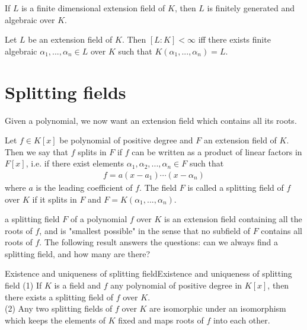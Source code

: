 \begin{theorem}{}{}
    If $L$ is a finite dimensional extension field of $K$, then $L$ is 
    finitely generated and algebraic over $K$.
\end{theorem}


\begin{theorem}{}{}
    Let $L$ be an extension field of $K$. Then 
    $[L:K]<\infty$ iff there exists finite algebraic $\alpha_1,...,\alpha_n\in L$ over $K$
    such that $K(\alpha_1,...,\alpha_n)=L$.
\end{theorem}

\section{Splitting fields}

Given a polynomial, we now want an extension field which contains all its roots.

\begin{definition}{}{}
    Let $f\in K[x]$ be polynomial of positive degree and $F$ an extension field of $K$.
    Then we say that $f$ splits in $F$ if $f$ can be written as a product of linear factors in $F[x]$,
    i.e. if there exist elements $\alpha_1,\alpha_2,...,\alpha_n\in F$ such that
    \begin{align*}
        f=a(x-a_1)\cdots (x-\alpha_n)
    \end{align*}
    where $a$ is the leading coefficient of $f$.
    The field $F$ is called a splitting field of $f$ over $K$ if it splits in $F$ and $F=K(\alpha_1,...,\alpha_n)$. 
\end{definition}
\begin{remark}
    a splitting field $F$ of a polynomial $f$ over $K$ is an extension field containing all
    the roots of $f$, and is "smallest possible" in the sense that
    no subfield of $F$ contains all roots of $f$.
    The following
result answers the questions: can we always find a splitting field, and how many are there?
\end{remark}

\begin{theorem}{Existence and uniqueness of splitting field}{Existence and uniqueness of splitting field}
    (1) If $K$ is a field and $f$ any polynomial of positive degree in $K[x]$,
    then there exists a splitting field of $f$ over $K$.\\
    (2) Any two splitting fields of $f$ over $K$ are isomorphic under an isomorphism which keeps the elements of $K$ fixed and
    maps roots of $f$ into each other.
\end{theorem}

